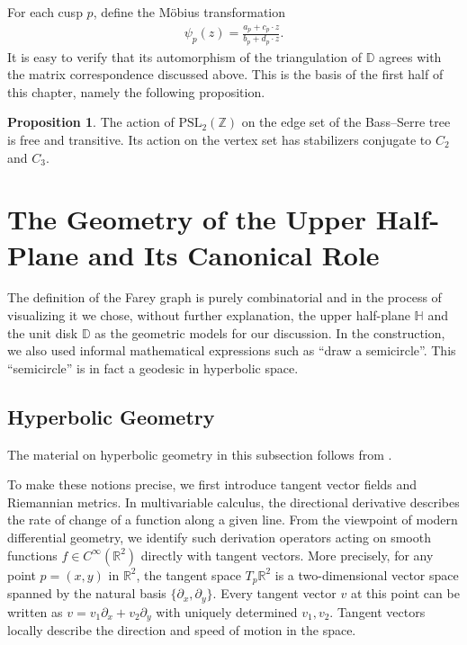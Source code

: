 \documentclass[10pt, a4paper]{article}
\newcommand{\D}{\mathbb{D}}
\newcommand{\HH}{\mathbb{H}} %
\theoremstyle{definition}
\newtheorem{proposition}[theorem]{Proposition}
\theoremstyle{remark}
\begin{document}
For each cusp \(p\), define the Möbius transformation
\begin{align*}
    \psi_p(z) = \frac{a_p+c_p \cdot z}{b_p+d_p\cdot z}.
\end{align*}
It is easy to verify that its automorphism of the triangulation of \(\D\) agrees with the matrix correspondence discussed above. This is the basis of the first half of this chapter, namely the following proposition.



\begin{proposition}
The action of \(\mathrm{PSL}_2(\mathbb Z)\) on the edge set of the Bass--Serre tree is free and transitive. Its action on the vertex set has stabilizers conjugate to \(C_2\) and \(C_3\).
\end{proposition}

\section{The Geometry of the Upper Half-Plane and Its Canonical Role}

The definition of the Farey graph is purely combinatorial and in the process of visualizing it we chose, without further explanation, the upper half-plane \(\HH\) and the unit disk \(\D\) as the geometric models for our discussion. In the construction, we also used informal mathematical expressions such as ``draw a semicircle''.
This ``semicircle'' is in fact a geodesic in hyperbolic space.

\subsection{Hyperbolic Geometry}

The material on hyperbolic geometry in this subsection follows from \cite{RatcliffeHyperbolicManifolds}.

To make these notions precise, we first introduce tangent vector fields and Riemannian metrics.
In multivariable calculus, the directional derivative describes the rate of change of a function along a given line. From the viewpoint of modern differential geometry, we identify such derivation operators acting on smooth functions \(f \in C^\infty(\mathbb{R}^2)\) directly with tangent vectors.
More precisely, for any point \(p=(x,y)\) in \(\mathbb{R}^2\), the tangent space \(T_p\mathbb{R}^2\) is a two-dimensional vector space spanned by the natural basis \(\{\partial_x, \partial_y\}\).
Every tangent vector \(v\) at this point can be written as \(v = v_1 \partial_x + v_2 \partial_y\) with uniquely determined $v_1,v_2$. Tangent vectors locally describe the direction and speed of motion in the space.
\end{document}
